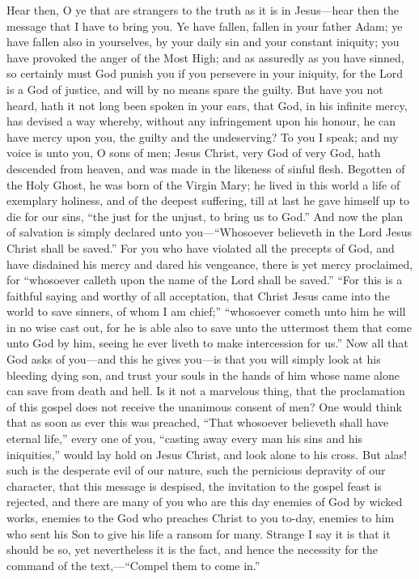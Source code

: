 \documentclass[
]{book}
\begin{document}
Hear then, O ye that are strangers to the truth as it is in Jesus---hear then the message that I have to bring you. Ye have fallen, fallen in your father Adam; ye have fallen also in yourselves, by your daily sin and your constant iniquity; you have provoked the anger of the Most High; and as assuredly as you have sinned, so certainly must God punish you if you persevere in your iniquity, for the Lord is a God of justice, and will by no means spare the guilty. But have you not heard, hath it not long been spoken in your ears, that God, in his infinite mercy, has devised a way whereby, without any infringement upon his honour, he can have mercy upon you, the guilty and the undeserving? To you I speak; and my voice is unto you, O sons of men; Jesus Christ, very God of very God, hath descended from heaven, and was made in the likeness of sinful flesh. Begotten of the Holy Ghost, he was born of the Virgin Mary; he lived in this world a life of exemplary holiness, and of the deepest suffering, till at last he gave himself up to die for our sins, ``the just for the unjust, to bring us to God.'' And now the plan of salvation is simply declared unto you---``Whosoever believeth in the Lord Jesus Christ shall be saved.'' For you who have violated all the precepts of God, and have disdained his mercy and dared his vengeance, there is yet mercy proclaimed, for ``whosoever calleth upon the name of the Lord shall be saved.'' ``For this is a faithful saying and worthy of all acceptation, that Christ Jesus came into the world to save sinners, of whom I am chief;'' ``whosoever cometh unto him he will in no wise cast out, for he is able also to save unto the uttermost them that come unto God by him, seeing he ever liveth to make intercession for us.'' Now all that God asks of you---and this he gives you---is that you will simply look at his bleeding dying son, and trust your souls in the hands of him whose name alone can save from death and hell. Is it not a marvelous thing, that the proclamation of this gospel does not receive the unanimous consent of men? One would think that as soon as ever this was preached, ``That whosoever believeth shall have eternal life,'' every one of you, ``casting away every man his sins and his iniquities,'' would lay hold on Jesus Christ, and look alone to his cross. But alas! such is the desperate evil of our nature, such the pernicious depravity of our character, that this message is despised, the invitation to the gospel feast is rejected, and there are many of you who are this day enemies of God by wicked works, enemies to the God who preaches Christ to you to-day, enemies to him who sent his Son to give his life a ransom for many. Strange I say it is that it should be so, yet nevertheless it is the fact, and hence the necessity for the command of the text,---``Compel them to come in.''
\end{document}
